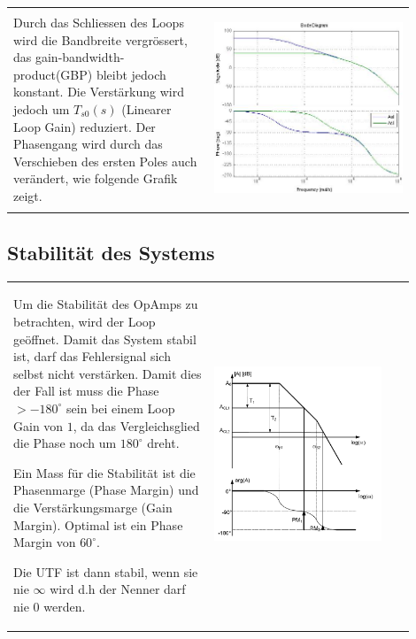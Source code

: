 \begin{tabular}{m{0.45\linewidth}m{0.45\linewidth}}
	Durch das Schliessen des Loops wird die Bandbreite vergrössert, das gain-bandwidth-product(GBP) bleibt jedoch konstant. Die Verstärkung wird jedoch um $T_{s0}(s)$ (Linearer Loop Gain) reduziert. Der Phasengang wird durch das Verschieben des ersten Poles auch verändert, wie folgende Grafik zeigt.
	& \begin{center}
        \includegraphics[width=6.7cm, valign=t]{./pictures/AolAcl.png}
    \end{center}
\end{tabular}
\vspace{-7mm}
\subsection{Stabilität des Systems}
\begin{tabular}{m{0.45\linewidth}m{0.45\linewidth}}
    Um die Stabilität des OpAmps zu betrachten, wird der Loop geöffnet. Damit das System stabil ist, darf das       
    Fehlersignal sich selbst nicht verstärken. Damit dies der Fall ist muss die Phase $>-180^\circ$ sein bei einem Loop Gain von $1$, da das Vergleichsglied die Phase noch um $180^\circ$ dreht. 
    
    Ein Mass für die Stabilität ist die 
    Phasenmarge (Phase Margin) und die Verstärkungsmarge (Gain Margin). Optimal ist ein Phase Margin von $60^{\circ}$.
    
    Die UTF ist dann stabil, wenn sie nie $\infty$ wird d.h der Nenner darf nie 0 werden.
    & \begin{center}
        \includegraphics[width=5cm, valign=t]{./pictures/margins.png}
    \end{center}
\end{tabular}

